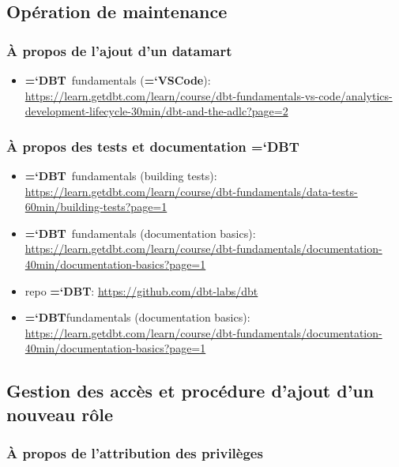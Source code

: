 \documentclass[11pt]{article}
\newcommand{\program}[1]{{\ttfamily\bfseries\hyphenchar\font=`\-\color{Maroon}#1}}
\newcommand{\techno}[1]{{\ttfamily\bfseries\hyphenchar\font=`\-\color{Sienna}#1}}
\newcommand{\dbt}{\techno{DBT}}
\newcommand{\vscode}{\program{VSCode}}
\begin{document}
\subsection{Opération de maintenance}

\subsubsection{À propos de l'ajout d'un datamart} \label{ann:ajout_datamart_liens_utiles}

\begin{itemize}
    \item \dbt\ fundamentals (\vscode): \url{https://learn.getdbt.com/learn/course/dbt-fundamentals-vs-code/analytics-development-lifecycle-30min/dbt-and-the-adlc?page=2}
\end{itemize}


\subsubsection{À propos des tests et documentation \dbt} \label{ann:tests_docs_dbt_liens_utiles}

\begin{itemize}
    \item \dbt\ fundamentals (building tests): \url{https://learn.getdbt.com/learn/course/dbt-fundamentals/data-tests-60min/building-tests?page=1}
    \item \dbt\ fundamentals (documentation basics): \url{https://learn.getdbt.com/learn/course/dbt-fundamentals/documentation-40min/documentation-basics?page=1}
    \item repo \dbt: \url{https://github.com/dbt-labs/dbt}
    \item \dbt fundamentals (documentation basics): \url{https://learn.getdbt.com/learn/course/dbt-fundamentals/documentation-40min/documentation-basics?page=1}
\end{itemize}


\subsection{Gestion des accès et procédure d'ajout d'un nouveau rôle}

\subsubsection{À propos de l'attribution des privilèges} \label{ann:attribution_privileges_liens_utiles}
\end{document}
